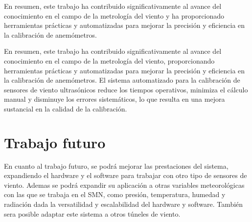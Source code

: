 En resumen, este trabajo ha contribuido significativamente al avance del conocimiento en el campo de la metrología del viento y ha proporcionado herramientas prácticas y automatizadas para mejorar la precisión y eficiencia en la calibración de anemómetros.

En resumen, este trabajo ha contribuido significativamente al avance del conocimiento en el campo de la metrología del viento, proporcionando herramientas prácticas y automatizadas para mejorar la precisión y eficiencia en la calibración de anemómetros. El sistema automatizado para la calibración de sensores de viento ultrasónicos reduce los tiempos operativos, minimiza el cálculo manual y disminuye los errores sistemáticos, lo que resulta en una mejora sustancial en la calidad de la calibración.

\section{Trabajo futuro}

En cuanto al trabajo futuro, se podrá mejorar las prestaciones del sistema, expandiendo el hardware y el software para trabajar con otro tipo de sensores de viento. Ademas se podrá expandir su aplicación a otras variables meteorológicas con las que se trabaja en el SMN, como presión, temperatura, humedad y radiación dada la versatilidad y escalabilidad del hardware y software. También sera posible adaptar este sistema a otros túneles de viento.



